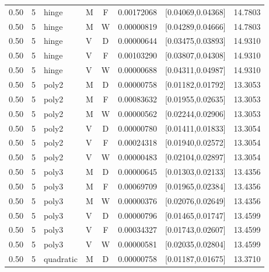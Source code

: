 \begin{longtable}{rrllcrrr}
0.50 & 5 & hinge & M & F & 0.00172068 & [0.04069,0.04368] & 14.7803 \\

0.50 & 5 & hinge & M & W & 0.00000819 & [0.04289,0.04666] & 14.7803 \\

0.50 & 5 & hinge & V & D & 0.00000644 & [0.03475,0.03893] & 14.9310 \\

0.50 & 5 & hinge & V & F & 0.00103290 & [0.03807,0.04308] & 14.9310 \\

0.50 & 5 & hinge & V & W & 0.00000688 & [0.04311,0.04987] & 14.9310 \\

0.50 & 5 & poly2 & M & D & 0.00000758 & [0.01182,0.01792] & 13.3053 \\

0.50 & 5 & poly2 & M & F & 0.00083632 & [0.01955,0.02635] & 13.3053 \\

0.50 & 5 & poly2 & M & W & 0.00000562 & [0.02244,0.02906] & 13.3053 \\

0.50 & 5 & poly2 & V & D & 0.00000780 & [0.01411,0.01833] & 13.3054 \\

0.50 & 5 & poly2 & V & F & 0.00024318 & [0.01940,0.02572] & 13.3054 \\

0.50 & 5 & poly2 & V & W & 0.00000483 & [0.02104,0.02897] & 13.3054 \\

0.50 & 5 & poly3 & M & D & 0.00000645 & [0.01303,0.02133] & 13.4356 \\

0.50 & 5 & poly3 & M & F & 0.00069709 & [0.01965,0.02384] & 13.4356 \\

0.50 & 5 & poly3 & M & W & 0.00000376 & [0.02076,0.02649] & 13.4356 \\

0.50 & 5 & poly3 & V & D & 0.00000796 & [0.01465,0.01747] & 13.4599 \\

0.50 & 5 & poly3 & V & F & 0.00034327 & [0.01743,0.02607] & 13.4599 \\

0.50 & 5 & poly3 & V & W & 0.00000581 & [0.02035,0.02804] & 13.4599 \\

0.50 & 5 & quadratic & M & D & 0.00000758 & [0.01187,0.01675] & 13.3710 \\


\end{longtable}
